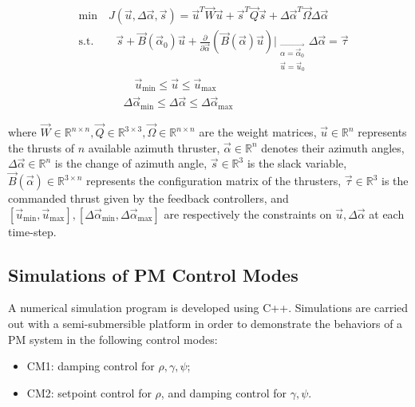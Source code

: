 \begin{sloppypar}
\begin{align}
&\mathrm{min} \quad J(\vec{u}, \Delta\vec{\alpha}, \vec{s}) = \vec{u}^T\vec{W}\vec{u} + \vec{s}^T\vec{Q}\vec{s} + \Delta\vec{\alpha}^T\vec{\Omega}\Delta\vec{\alpha} \\
&\mathrm{s.t.} \qquad \vec{s} + \vec{B}(\vec{\alpha}_0)\vec{u} + \frac{\partial}{\partial \vec{\alpha}}\left( \vec{B}(\vec{\alpha})\vec{u} \right)|_{\substack{\vec{\alpha = \vec{\alpha}_0} \\ \vec{u} = \vec{u}_0}} \Delta\vec{\alpha} = \vec{\tau} \\
& \qquad \qquad \quad \vec{u}_{\mathrm{min}} \leq \vec{u} \leq \vec{u}_{\mathrm{max}} \\
& \qquad \qquad \Delta\vec{\alpha}_{\mathrm{min}} \leq \Delta\vec{\alpha} \leq \Delta\vec{\alpha}_{\mathrm{max}}
\end{align}

\noindent where $\vec{W}\in\mathbb{R}^{n\times n}, \vec{Q}\in\mathbb{R}^{3\times 3}, \vec{\Omega}\in\mathbb{R}^{n\times n}$ are the weight matrices, $\vec{u} \in \mathbb{R}^n$ represents the thrusts of $n$ available azimuth thruster, $\vec{\alpha} \in \mathbb{R}^n$ denotes their azimuth angles, $\Delta\vec{\alpha} \in \mathbb{R}^n$ is the change of azimuth angle, $\vec{s}\in\mathbb{R}^3$ is the slack variable, $\vec{B}(\vec{\alpha})\in\mathbb{R}^{3\times n}$ represents the configuration matrix of the thrusters, $\vec{\tau}\in\mathbb{R}^3$ is the commanded thrust given by the feedback controllers, and $[\vec{u}_{\mathrm{min}}, \vec{u}_{\mathrm{max}}], [\Delta\vec{\alpha}_{\mathrm{min}}, \Delta\vec{\alpha}_{\mathrm{max}}]$ are respectively the constraints on $\vec{u}, \Delta\vec{\alpha}$ at each time-step.

\subsection {Simulations of PM Control Modes}
A numerical simulation program is developed using C++. Simulations are carried out with a semi-submersible platform in order to demonstrate the behaviors of a PM system in the following control modes:

\begin{itemize}
	\item CM1: damping control for $\rho, \gamma, \psi$;
	\item CM2: setpoint control for $\rho$, and damping control for $\gamma, \psi$.
\end{itemize}


\end{sloppypar}
